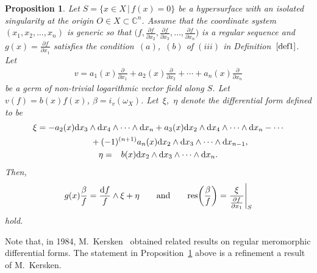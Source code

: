 \documentclass[pdftex]{sigma}%
\numberwithin{equation}{section}
\newtheorem{Proposition}[Theorem]{Proposition}
 { \theoremstyle{definition}
\newtheorem{Definition}[Theorem]{Definition}
\newtheorem{Remark}[Theorem]{Remark}
\newtheorem{Example}[Theorem]{Example}
 }
\begin{document}
\begin{Proposition}\label{pro4}
 Let $S=\{ x \in X \,|\, f(x)=0 \} $ be a hypersurface with an isolated singularity at the origin $ O \in X \subset {\mathbb C}^n$.
Assume that the coordinate system $ (x_1,x_2,\ldots,x_n) $ is generic so that
$\big(f, \frac{\partial f}{\partial x_2}, \frac{\partial f}{\partial x_3},\ldots,\frac{\partial f}{\partial x_{n}}\big)$ is a regular sequence and $ g(x) =\frac{\partial f}{\partial x_1} $ satisfies the condition~$(a)$,~$(b)$ of $(iii)$ in Definition~$\ref{def1}$.
Let
\begin{gather*}
v=a_1(x)\frac{\partial}{\partial x_1} + a_2(x)\frac{\partial}{\partial x_2}+ \cdots +a_n(x)\frac{\partial}{\partial x_n}
\end{gather*}
be a germ of non-trivial logarithmic vector field along $S$. Let $ v(f)=b(x)f(x)$, $\beta=i_v(\omega_X)$. Let~$\xi$,~$\eta$ denote the differential form defined to be
\begin{gather*}
\xi = -a_2(x){\rm d}x_3 \wedge {\rm d}x_4 \wedge \cdots \wedge {\rm d}x_n +a_3(x){\rm d}x_2 \wedge {\rm d}x_4 \wedge \cdots \wedge {\rm d}x_n - \cdots
\\\phantom{\xi =-}{}
 +(-1)^{(n+1)}a_n(x){\rm d}x_2 \wedge {\rm d}x_3 \wedge \cdots \wedge {\rm d}x_{n-1}, \\
\eta = \phantom{-}b(x) {\rm d}x_2 \wedge {\rm d}x_3 \wedge \cdots \wedge {\rm d}x_n.
\end{gather*}
Then,
\begin{gather*}
g(x)\frac{\beta}{f} = \frac{{\rm d}f}{f}\wedge \xi + \eta\qquad
\text{and} \qquad
{\rm res}\bigg(\frac{\beta}{f}\bigg) = \frac{\xi}{\frac{\partial f}{\partial x_1}}\Bigg|_S
\end{gather*}
 hold.
 \end{Proposition}

Note that, in 1984, M.~Kersken~\cite{K84} obtained related results on regular meromorphic differential forms. The statement in Proposition~\ref{pro4} above is a refinement a result of M.~Kersken.
\end{document}

